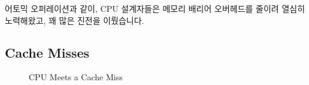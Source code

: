 어토믹 오퍼레이션과 같이, CPU 설계자들은 메모리 배리어 오버헤드를 줄이려 열심히
노력해왔고, 꽤 많은 진전을 이뤘습니다.

\subsection{Cache Misses}
\label{sec:cpu:Cache Misses}

\begin{figure}[tb]
\centering
{}
\caption{CPU Meets a Cache Miss}
\end{figure}

